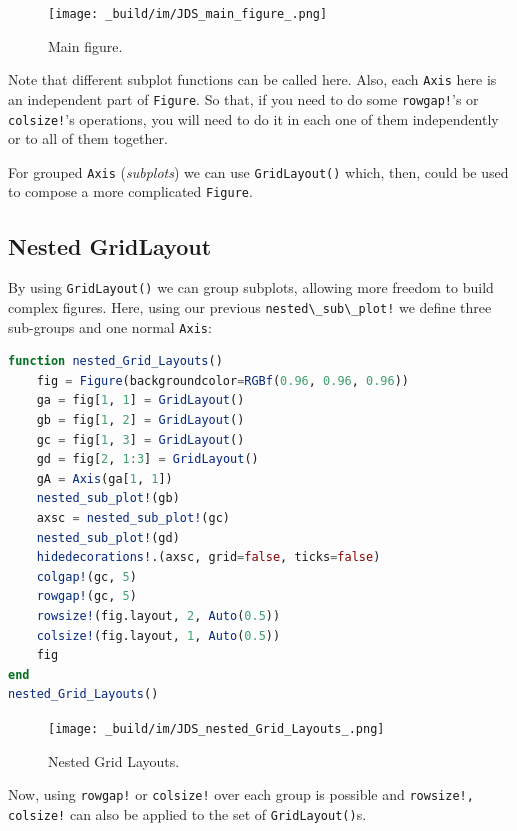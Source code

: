\documentclass[
  notoc %
]{tufte-book}
\newcommand{\passthrough}[1]{#1}
\begin{document}
\begin{figure}
\hypertarget{fig:main_figure}{%
\centering
\texttt{[image: \_build/im/JDS\_main\_figure\_.png]}
\caption{Main figure.}\label{fig:main_figure}
}
\end{figure}

Note that different subplot functions can be called here. Also, each
\passthrough{\lstinline!Axis!} here is an independent part of
\passthrough{\lstinline!Figure!}. So that, if you need to do some
\passthrough{\lstinline"rowgap!"}'s or
\passthrough{\lstinline"colsize!"}'s operations, you will need to do it
in each one of them independently or to all of them together.

For grouped \passthrough{\lstinline!Axis!} (\emph{subplots}) we can use
\passthrough{\lstinline!GridLayout()!} which, then, could be used to
compose a more complicated \passthrough{\lstinline!Figure!}.

\hypertarget{nested-gridlayout}{%
\subsection{Nested GridLayout}\label{nested-gridlayout}}

By using \passthrough{\lstinline!GridLayout()!} we can group subplots,
allowing more freedom to build complex figures. Here, using our previous
\passthrough{\lstinline"nested\_sub\_plot!"} we define three sub-groups
and one normal \passthrough{\lstinline!Axis!}:

\begin{lstlisting}[language=Julia]
function nested_Grid_Layouts()
    fig = Figure(backgroundcolor=RGBf(0.96, 0.96, 0.96))
    ga = fig[1, 1] = GridLayout()
    gb = fig[1, 2] = GridLayout()
    gc = fig[1, 3] = GridLayout()
    gd = fig[2, 1:3] = GridLayout()
    gA = Axis(ga[1, 1])
    nested_sub_plot!(gb)
    axsc = nested_sub_plot!(gc)
    nested_sub_plot!(gd)
    hidedecorations!.(axsc, grid=false, ticks=false)
    colgap!(gc, 5)
    rowgap!(gc, 5)
    rowsize!(fig.layout, 2, Auto(0.5))
    colsize!(fig.layout, 1, Auto(0.5))
    fig
end
nested_Grid_Layouts()
\end{lstlisting}

\begin{figure}
\hypertarget{fig:nested_Grid_Layouts}{%
\centering
\texttt{[image: \_build/im/JDS\_nested\_Grid\_Layouts\_.png]}
\caption{Nested Grid Layouts.}\label{fig:nested_Grid_Layouts}
}
\end{figure}

Now, using \passthrough{\lstinline"rowgap!"} or
\passthrough{\lstinline"colsize!"} over each group is possible and
\passthrough{\lstinline"rowsize!, colsize!"} can also be applied to the
set of \passthrough{\lstinline!GridLayout()!}s.
\end{document}
